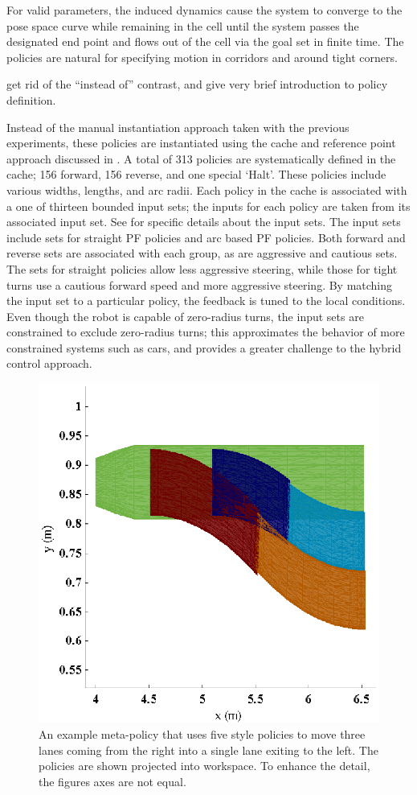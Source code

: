 For valid parameters, the induced dynamics cause
the system to converge to the pose space curve while remaining in the
cell until the system passes the designated end point and flows out of
the cell via the goal set in finite time.
The \PF policies are natural for specifying motion in corridors and around tight corners. 

{\large get rid of the ``instead of'' contrast, and give very brief introduction to policy definition.}

Instead of the manual instantiation approach taken with the previous experiments,
these \PF policies are instantiated using the cache and reference point approach
discussed in .  A total of 313 policies are systematically defined in
the cache; 156 forward, 156 reverse, and one special `Halt'.  These policies include
various widths, lengths, and arc radii.  Each policy in the cache is associated with
a one of thirteen bounded input sets; the inputs for each policy are taken from its
associated input set.  See  for specific details about the input sets.
The input sets include sets for straight PF policies and arc based PF policies.  Both
forward and reverse sets are associated with each group, as are aggressive and
cautious sets.  The sets for straight policies allow less aggressive steering, while
those for tight turns use a cautious forward speed and more aggressive steering.  By
matching the input set to a particular policy, the feedback is tuned to the local
conditions.  Even though the robot is capable of zero-radius turns, the input sets
are constrained to exclude zero-radius turns; this approximates the behavior of more
constrained systems such as cars, and provides a greater challenge to the hybrid
control approach.


\begin{figure}[bt]
  \centering 
   \includegraphics[width=0.55\linewidth]{graphics/lagr_meta_detail.eps}

   \caption[`LAGR' meta-policies.]{An example meta-policy that uses five \PF
     style policies to move three lanes coming from the right into a
     single lane exiting to the left.  The policies are shown
     projected into workspace.  To enhance the detail, the figures
     axes are not equal.}
   \label{fig:lagr_meta_detail}
\end{figure}

